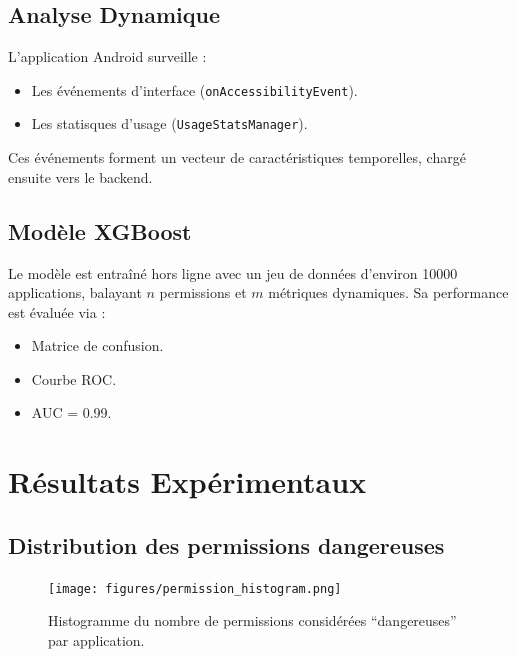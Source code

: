 \documentclass[conference]{IEEEtran}
\begin{document}
\subsection{Analyse Dynamique}
L’application Android surveille :
\begin{itemize}
  \item Les événements d’interface (\texttt{onAccessibilityEvent}).
  \item Les statisques d’usage (\texttt{UsageStatsManager}).
\end{itemize}
Ces événements forment un vecteur de caractéristiques temporelles, chargé ensuite vers le backend.

\subsection{Modèle XGBoost}
Le modèle est entraîné hors ligne avec un jeu de données d’environ \num{10000} applications,  
balayant $n$ permissions et $m$ métriques dynamiques.  
Sa performance est évaluée via :
\begin{itemize}
  \item Matrice de confusion.
  \item Courbe ROC.
  \item AUC = 0.99.
\end{itemize}

\section{Résultats Expérimentaux}

\subsection{Distribution des permissions dangereuses}
\begin{figure}[h]
  \centering
  \texttt{[image: figures/permission\_histogram.png]}
  \caption{Histogramme du nombre de permissions considérées ``dangereuses'' par application.}\label{fig:hist}
\end{figure}
\end{document}
